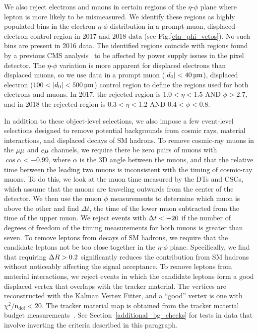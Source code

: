 

We also reject electrons and muons in certain regions of the $\eta$-$\phi$ plane where lepton \ad is more likely to be mismeasured. We identify these regions as highly populated bins in the electron $\eta$-$\phi$ distribution in a prompt-muon, displaced-electron control region in 2017 and 2018 data (see Fig.\ref{eta_phi_vetos}). No such bins are present in 2016 data. The identified regions coincide with regions found by a previous CMS analysis~\cite{disappearing_tracks} to be affected by power supply issues in the pixel detector. The $\eta$-$\phi$ variation is more apparent for displaced electrons than displaced muons, so we use data in a prompt muon ($\ad<\SI{40}{\um}$), displaced electron ($\num{100}<\ad<\SI{500}{\um}$) control region to define the  regions used for both electrons and muons. In 2017, the rejected region is $1.0<\eta<1.5$ AND $\phi>2.7$, and in 2018 the rejected region is $0.3<\eta<1.2$ AND $0.4<\phi<0.8$.



In addition to these object-level selections, we also impose a few event-level selections designed to remove potential backgrounds from cosmic rays, material interactions, and displaced decays of SM hadrons. To remove cosmic-ray muons in the ${\mu}{\mu}$ and $e{\mu}$ channels, we require there be zero pairs of muons with $\cos{\alpha}<-0.99$, where $\alpha$ is the 3D angle between the muons, and that the relative time between the leading two muons is inconsistent with the timing of cosmic-ray muons. To do this, we look at the muon time measured by the DTs and CSCs, which assume that the muons are traveling outwards from the center of the detector. We then use the muon $\phi$ measurements to determine which muon is above the other and find $\Delta t$, the time of the lower muon subtracted from the time of the upper muon. We reject events with $\Delta t< -20\ns$ if the number of degrees of freedom of the timing measurements for both muons is greater than seven. To remove leptons from decays of SM hadrons, we require that the candidate leptons not be too close together in the $\eta$-$\phi$ plane. Specifically, we find that requiring $\Delta R>0.2$ significantly reduces the contribution from SM hadrons without noticeably affecting the signal acceptance. To remove leptons from material interactions, we reject events in which the candidate leptons form a good displaced vertex that overlaps with the tracker material. The vertices are reconstructed with the Kalman Vertex Fitter, and a ``good'' vertex is one with $\chi^{2}/\mathrm{n_{dof}}< 20$. The tracker material map is obtained from the tracker material budget measurements~\cite{Sirunyan:2018icq,CMS-DP-2019-001}. See Section~\ref{additional_bg_checks} for tests in data that involve inverting the criteria described in this paragraph. 

